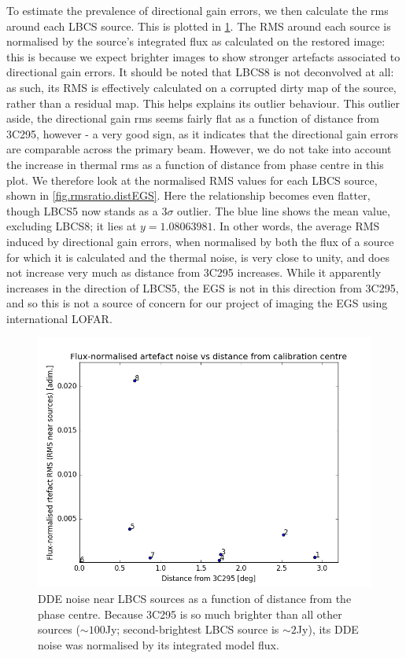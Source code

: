 \pg
To estimate the prevalence of directional gain errors, we then calculate the rms around each LBCS source. This is plotted in \cref{fig.dderms.distEGS}. The RMS around each source is normalised by the source's integrated flux as calculated on the restored image: this is because we expect brighter images to show stronger artefacts associated to directional gain errors. It should be noted that LBCS8 is not deconvolved at all: as such, its RMS is effectively calculated on a corrupted dirty map of the source, rather than a residual map. This helps explains its outlier behaviour. This outlier aside, the directional gain rms seems fairly flat as a function of distance from 3C295, however - a very good sign, as it indicates that the directional gain errors are comparable across the primary beam. However, we do not take into account the increase in thermal rms as a function of distance from phase centre in this plot. We therefore look at the normalised RMS values for each LBCS source, shown in \cref{fig.rmsratio.distEGS}. Here the relationship becomes even flatter, though LBCS5 now stands as a $3\sigma$ outlier. The blue line shows the mean value, excluding LBCS8; it lies at $y=1.08063981$. In other words, the average RMS induced by directional gain errors, when normalised by both the flux of a source for which it is calculated and the thermal noise, is very close to unity, and does not increase very much as distance from 3C295 increases. While it apparently increases in the direction of LBCS5, the EGS is not in this direction from 3C295, and so this is not a source of concern for our project of imaging the EGS using international LOFAR.
\begin{figure}[h!]
\includegraphics[width=0.8\linewidth]{images/ArtefactRMSvsDistFrom3c295.png}
\caption{DDE noise near LBCS sources as a function of distance from the phase centre. Because 3C295 is so much brighter than all other sources ($\sim100$Jy; second-brightest LBCS source is $\sim2$Jy), its DDE noise was normalised by its integrated model flux.}
\label{fig.dderms.distEGS}
\end{figure}
